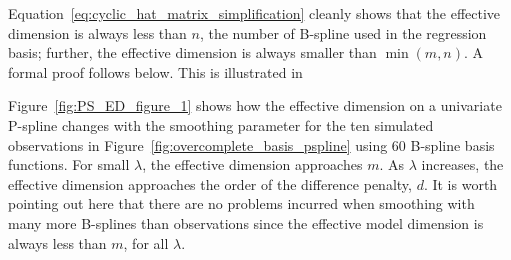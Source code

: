 %
%

Equation~\ref{eq:cyclic_hat_matrix_simplification} cleanly shows that the effective dimension is always less than $n$, the number of B-spline used in the regression basis; further, the effective dimension is always smaller than $\min\left(m,n\right)$. A formal proof follows below. This is illustrated in 

Figure~\ref{fig:PS_ED_figure_1} shows how the effective dimension on a univariate P-spline changes with the smoothing parameter for the ten simulated observations in Figure~\ref{fig:overcomplete_basis_pspline} using 60 B-spline basis functions. For small $\lambda$, the effective dimension approaches $m$. As $\lambda$ increases, the effective dimension approaches the order of the difference penalty, $d$. It is worth pointing out here that there are no problems incurred when smoothing with many more B-splines than observations since the effective model dimension is always less than $m$, for all $\lambda$. 

